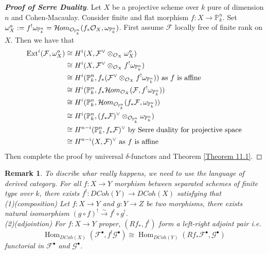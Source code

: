 \documentclass{ctexart}
\newtheorem{remark}{Remark}[section]
\renewcommand{\hom}{\operatorname{Hom}}
\newcommand{\ext}{\operatorname{Ext}}
\newcommand{\sheafhom}{\mathcal{H}\kern -.5pt om}
\begin{document}
\begin{proof}[\textbf{\emph{Proof of Serre Duality}}]
    Let $X$ be a projective scheme over $k$ pure of dimension $n$ and Cohen-Macaulay.
    Consider finite and flat morphism $f: X \longrightarrow \mathbb{P}_{k}^{n}$.
    Set $\omega_{X}^{o} := f^{!}\omega_{\mathbb{P}_{k}^{n}} = \sheafhom_{\mathcal{O}_{\mathbb{P}_{k}^{n}}}(f_{\ast}\mathcal{O}_{X}, \omega_{\mathbb{P}_{k}^{n}})$.
    First assume $\mathcal{F}$ locally free of finite rank on $X$.
    Then we have that
    \begin{equation*}
        \begin{split}
            \ext^{i}(\mathcal{F}, \omega_{X}^{o}) & \cong H^{i}(X, \mathcal{F}^{\lor} \otimes_{\mathcal{O}_{X}} \omega_{X}^{o}) \\
            & \cong H^{i}(X, \mathcal{F}^{\lor} \otimes_{\mathcal{O}_{X}} f^{!}\omega_{\mathbb{P}_{k}^{n}}) \\
            & \cong H^{i}(\mathbb{P}_{k}^{n}, f_{\ast}(\mathcal{F}^{\lor} \otimes_{\mathcal{O}_{X}} f^{!}\omega_{\mathbb{P}_{k}^{n}})) \text{ as $f$ is affine} \\
            & \cong H^{i}(\mathbb{P}_{k}^{n}, f_{\ast}\sheafhom_{\mathcal{O}_{X}}(\mathcal{F}, f^{!}\omega_{\mathbb{P}_{k}^{n}})) \\
            & \cong H^{i}(\mathbb{P}_{k}^{n}, \sheafhom_{\mathcal{O}_{\mathbb{P}_{k}^{n}}}(f_{\ast}\mathcal{F}, \omega_{\mathbb{P}_{k}^{n}})) \\
            & \cong H^{i}(\mathbb{P}_{k}^{n}, (f_{\ast}\mathcal{F})^{\lor} \otimes_{\mathcal{O}_{\mathbb{P}_{k}^{n}}} \omega_{\mathbb{P}_{k}^{n}}) \\
            & \cong H^{n - i}(\mathbb{P}_{k}^{n}, f_{\ast}\mathcal{F})^{\lor} \text{ by Serre duality for projective space} \\
            & \cong H^{n - i}(X, \mathcal{F})^{\lor} \text{ as $f$ is affine} 
        \end{split}
    \end{equation*}
    Then complete the proof by universal $\delta$-functors and Theorem \ref{Theorem 11.1}.
\end{proof}
\begin{remark}
    To discribe whar really happens, we need to use the language of derived category.
    For all $f: X \longrightarrow Y$ morphism between separated schemes of finite type over $k$,
    there exists $f^{!}: DCoh(Y) \longrightarrow DCoh(X)$ satisfying that \\
    (1)(composition) Let $f: X \longrightarrow Y$ and $g: Y \longrightarrow Z$ be two morphisms,
    there exists natural isomorphism $(g \circ f)^{!} \overset{\sim}{\longrightarrow} f^{!} \circ g^{!}$. \\
    (2)(adjointion) For $f: X \longrightarrow Y$ proper, $(Rf_{\ast}, f^{!})$ form a left-right adjoint pair i.e.
    \begin{equation*}
        \hom_{DCoh(X)}(\mathcal{F}^{\bullet}, f^{!}\mathcal{G}^{\bullet}) \cong \hom_{DCoh(Y)}(Rf_{\ast}\mathcal{F}^{\bullet}, \mathcal{G}^{\bullet})
    \end{equation*}
    functorial in $\mathcal{F}^{\bullet}$ and $\mathcal{G}^{\bullet}$.
\end{remark}
\end{document}
